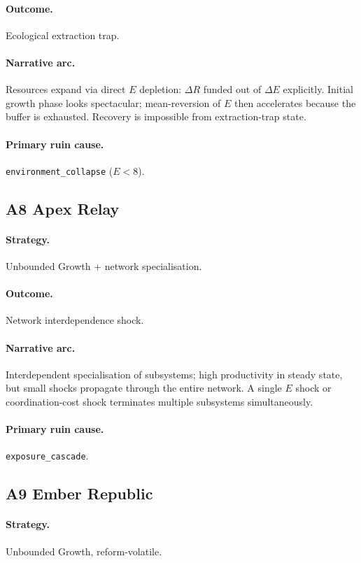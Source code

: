 \paragraph{Outcome.} Ecological extraction trap.
\paragraph{Narrative arc.}
Resources expand via direct $E$ depletion: $\Delta R$ funded
out of $\Delta E$ explicitly. Initial growth phase looks
spectacular; mean-reversion of $E$ then accelerates because the
buffer is exhausted. Recovery is impossible from extraction-trap
state.
\paragraph{Primary ruin cause.} \texttt{environment\_collapse}
($E < 8$).

\subsection{A8 Apex Relay}
\label{civ:a8}

\paragraph{Strategy.} Unbounded Growth + network specialisation.
\paragraph{Outcome.} Network interdependence shock.
\paragraph{Narrative arc.}
Interdependent specialisation of subsystems; high productivity
in steady state, but small shocks propagate through the entire
network. A single $E$ shock or coordination-cost shock terminates
multiple subsystems simultaneously.
\paragraph{Primary ruin cause.} \texttt{exposure\_cascade}.

\subsection{A9 Ember Republic}
\label{civ:a9}

\paragraph{Strategy.} Unbounded Growth, reform-volatile.
